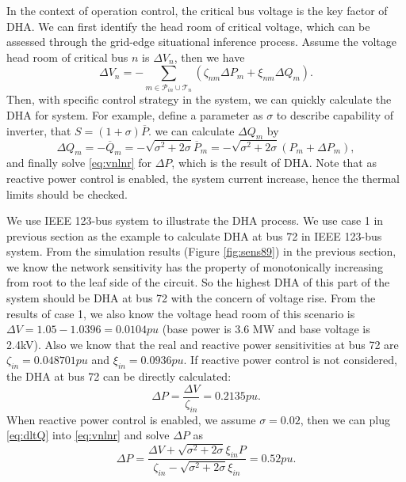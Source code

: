 \documentclass{article}
\begin{document}
In the context of operation control, the critical bus voltage is the key factor of DHA. We can first identify the head room of critical voltage, which can be assessed through the grid-edge situational inference process. Assume the voltage head room of critical bus $n$ is $\Delta V_n$, then we have
\begin{equation}
    \Delta V_n = -\sum_{ m \in\mathcal{P}_{in}\cup \mathcal{T}_n} (\zeta_{nm}\Delta P_m+ \xi_{nm} \Delta Q_m).\label{eq:vnlnr}
\end{equation}
Then, with specific control strategy in the system, we can quickly calculate the DHA for system. For example, define a parameter as $\sigma$ to describe capability of inverter, that $S=(1+\sigma)\overline{P}$. we can calculate $\Delta Q_m$ by 
\begin{equation}
    \Delta Q_m = -\overline{Q}_m  = -\sqrt{\sigma^2+2\sigma} \overline{P}_m= -\sqrt{\sigma^2+2\sigma} (P_m+\Delta{P}_m), \label{eq:dltQ}
\end{equation}
and finally solve \eqref{eq:vnlnr} for $\Delta P$,
which is the result of DHA. Note that as reactive power control is enabled, the system current increase, hence the thermal limits should be checked. 

We use IEEE 123-bus system to illustrate the DHA process. We use case 1 in previous section as the example to calculate DHA at bus 72 in IEEE 123-bus system. From the simulation results (Figure \ref{fig:sens89}) in the previous section, we know the network sensitivity has the property of monotonically increasing from root to the leaf side of the circuit. So the highest DHA of this part of the system should be DHA at bus 72 with the concern of voltage rise. From the results of case 1, we also know the voltage head room of this scenario is $\Delta V=1.05-1.0396=0.0104 pu$ (base power is 3.6 MW and base voltage is 2.4kV). Also we know that the real and reactive power sensitivities at bus 72 are $\zeta_{in} = 0.048701pu$ and $\xi_{in}=0.0936pu$. If reactive power control is not considered, the DHA at bus 72 can be directly calculated:
\begin{equation}
    \Delta P = \frac{\Delta V}{\zeta_{in}} = 0.2135pu.
\end{equation}
When reactive power control is enabled, we assume $\sigma=0.02$, then we can plug \eqref{eq:dltQ} into \eqref{eq:vnlnr} and solve $\Delta P$ as
\begin{equation}
    \Delta P = \frac{\Delta V+\sqrt{\sigma^2+2\sigma}\xi_{in}P}{\zeta_{in}-\sqrt{\sigma^2+2\sigma}\xi_{in}} = 0.52pu.
\end{equation}
\end{document}
